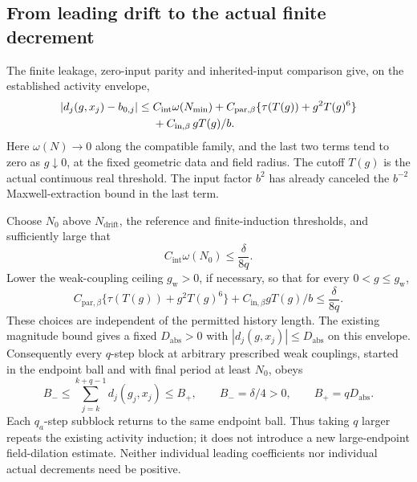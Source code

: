 \documentclass[11pt]{article}
\theoremstyle{remark}
\begin{document}
\subsection{From leading drift to the actual finite decrement}
\label{lpd-actual-drift}

The finite leakage, zero-input parity and inherited-input comparison
give, on the established activity envelope,
\begin{align}
 |d_j(g,x_j)-b_{0,j}|
 \le{}&C_{\mathrm{int}}\omega(N_{\min})
    +C_{\mathrm{par},\beta}
          \{\tau(T(g))+g^2T(g)^6\}\notag\\
 &+C_{\mathrm{in},\beta}\,gT(g)/b .
 \label{lpd-error}
\end{align}
Here \(\omega(N)\to0\) along the compatible family, and the last
two terms tend to zero as \(g\downarrow0\), at the fixed geometric
data and field radius. The cutoff \(T(g)\) is the actual continuous
real threshold. The input factor \(b^2\) has already canceled the
\(b^{-2}\) Maxwell-extraction bound in the last term.

Choose \(N_0\) above \(N_{\mathrm{drift}}\), the reference and
finite-induction thresholds, and sufficiently large that
\begin{equation}
 C_{\mathrm{int}}\omega(N_0)\le\frac{\delta}{8q}.
 \label{lpd-period-threshold}
\end{equation}
Lower the weak-coupling ceiling \(g_{\mathrm w}>0\), if necessary,
so that for every \(0<g\le g_{\mathrm w}\),
\begin{equation}
 C_{\mathrm{par},\beta}
       \{\tau(T(g))+g^2T(g)^6\}
      +C_{\mathrm{in},\beta}gT(g)/b
       \le\frac{\delta}{8q}.
 \label{lpd-coupling-threshold}
\end{equation}
These choices are independent of the permitted history length.
The existing magnitude bound gives a fixed \(D_{\mathrm{abs}}>0\)
with \(|d_j(g,x_j)|\le D_{\mathrm{abs}}\) on this envelope.
Consequently every \(q\)-step block at arbitrary prescribed weak
couplings, started in the endpoint ball and with final period at
least \(N_0\), obeys
\begin{equation}
 B_-\le\sum_{j=k}^{k+q-1}d_j(g_j,x_j)\le B_+,\qquad
 B_-=\delta/4>0,\qquad B_+=qD_{\mathrm{abs}}.
 \label{lpd-block-bounds}
\end{equation}
Each \(q_a\)-step subblock returns to the same endpoint ball.
Thus taking \(q\) larger repeats the existing activity induction;
it does not introduce a new large-endpoint field-dilation estimate.
Neither individual leading coefficients nor individual actual
decrements need be positive.
\end{document}
